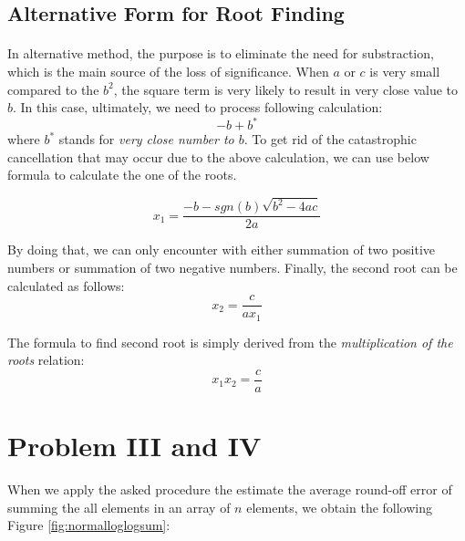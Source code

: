 \documentclass[letterpaper,12pt]{article}
\begin{document}
\subsection{Alternative Form for Root Finding}
\paragraph{}In alternative method, the purpose is to eliminate the need for substraction, which is the main source of the loss of significance. When $a$ or $c$ is very small compared to the $b^2$, the square term is very likely to result in very close value to $b$. In this case, ultimately, we need to process following calculation:
\begin{equation*}
   -b + b^*
\end{equation*}
where $b^*$ stands for \textit{very close number to $b$}. To get rid of the catastrophic cancellation that may occur due to the above calculation, we can use below formula to calculate the one of the roots.

\begin{equation*}
   x_{1} = \frac{-b - sgn(b)\sqrt{b^2 - 4ac}}{2a}
\end{equation*}

By doing that, we can only encounter with either summation of two positive numbers or summation of two negative numbers. Finally, the second root can be calculated as follows:
\begin{equation*}
   x_{2} = \frac{c}{a x_1}
\end{equation*}

The formula to find second root is simply derived from the \textit{multiplication of the roots} relation:
\begin{equation*}
   x_1x_{2} = \frac{c}{a}
\end{equation*}

\pagebreak
\section{Problem III and IV}
When we apply the asked procedure the estimate the average round-off error of summing the all elements in an array of $n$ elements, we obtain the following Figure \ref{fig:normalloglogsum}:
\end{document}
